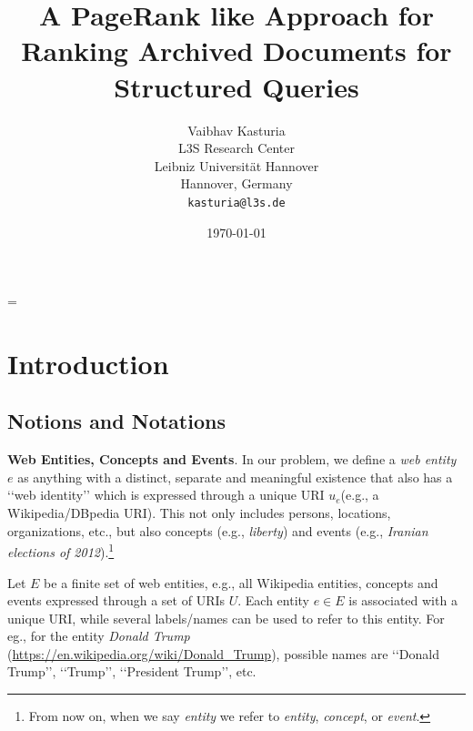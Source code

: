 \documentclass{article}
\newcommand{\q}[1]{\lq\lq{}{}#1\rq\rq{}{}}
\begin{document}
\title{
    A PageRank like Approach for Ranking Archived Documents for Structured Queries
}

\author{
    Vaibhav Kasturia\\
    L3S Research Center\\
    Leibniz Universit\"{a}t Hannover\\
    Hannover, Germany\\
    \texttt{kasturia@l3s.de}
    }
    \date{\today}
\maketitle

    \emergencystretch=\maxdimen

\section{Introduction}
\subsection{Notions and Notations}

{\bf Web Entities, Concepts and Events}.
In our problem, we define a {\em web entity} $e$ as anything with a 
distinct, separate and meaningful existence that also has a \q{web identity} which is expressed through a unique URI $u_e$(e.g., a Wikipedia/DBpedia URI).
This not only includes persons, locations, organizations, etc., but also
concepts (e.g., {\em liberty}) and events (e.g., {\em Iranian elections of 2012}).\footnote{From now on, when we say {\em entity} we refer to {\em entity}, {\em concept}, or {\em event}.}

Let $E$ be a finite set of web entities, e.g., all Wikipedia entities, concepts and events expressed through a set of URIs $U$.
Each entity $e \in E$ is associated with a unique URI, while several labels/names
can be used to refer to this entity.
For eg., for the entity {\em Donald Trump} (\url{https://en.wikipedia.org/wiki/Donald_Trump}),
possible names are \q{Donald Trump}, \q{Trump}, \q{President Trump}, etc.
\end{document}

